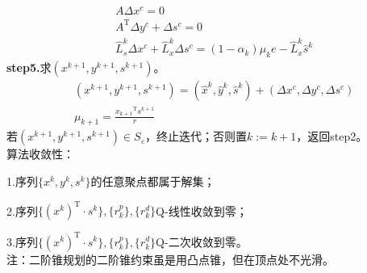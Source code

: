         \begin{align*}
        & A \Delta x^c=0\\
        & A^\mathrm{T} \Delta y^c+\Delta s^c=0\\
        & {\hat{L}}^k_s\Delta x^c+{\hat{L}}^k_x\Delta s^c=(1-{\alpha}_k){\mu}_k e-{\hat{L}}^k_x{\hat{s}}^k
        \end{align*}
        \textbf{step5.}求$(x^{k+1},y^{k+1},s^{k+1})$。
        \begin{align*}
        &(x^{k+1},y^{k+1},s^{k+1})=({\hat{x}}^k,{\hat{y}}^k,{\hat{s}}^k)+(\Delta x^c,\Delta y^c,\Delta s^c)\\
        &{\mu}_{k+1}=\frac{{x_{k+1}}^\mathrm{T} s^{k+1}}{r}
        \end{align*}
        若$(x^{k+1},y^{k+1},s^{k+1})\in S_{\varepsilon}$，终止迭代；否则置$k:=k+1$，返回step2。\\
        算法收敛性：\par
        1.序列$\{x^k,y^k,s^k\}$的任意聚点都属于解集；\par
        2.序列$\{(x^k)^\mathrm{T} \cdot s^k\},\{r_k^p\},\{r_k^d\}$Q-线性收敛到零；\par
        3.序列$\{(x^k)^\mathrm{T} \cdot s^k\},\{r_k^p\},\{r_k^d\}$Q-二次收敛到零。\\
        注：二阶锥规划的二阶锥约束虽是用凸点锥，但在顶点处不光滑。
